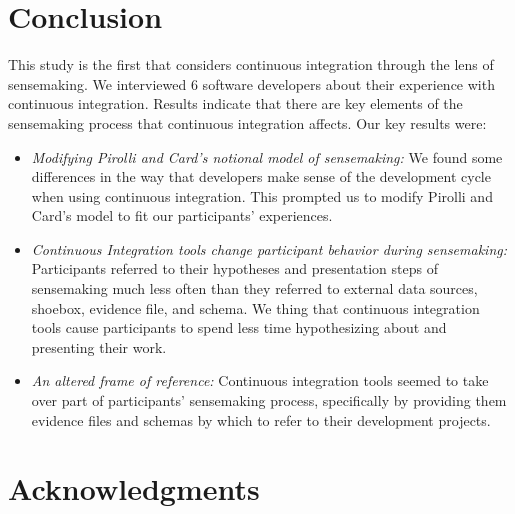 \documentclass{sig-alternate}
\begin{document}
\section{Conclusion}
This study is the first that considers continuous integration through the lens of sensemaking. We interviewed 6 software developers about their experience with continuous integration. Results indicate that there are key elements of the sensemaking process that continuous integration affects. Our key results were:
\begin{itemize}  
	\item \textit{Modifying Pirolli and Card's notional model of sensemaking:} We found some differences in the way that developers make sense of the development cycle when using continuous integration. This prompted us to modify Pirolli and Card's model to fit our participants' experiences.
	\item \textit{Continuous Integration tools change participant behavior during sensemaking:} Participants referred to their hypotheses and presentation steps of sensemaking much less often than they referred to external data sources, shoebox, evidence file, and schema. We thing that continuous integration tools cause participants to spend less time hypothesizing about and presenting their work. 
	\item \textit{An altered frame of reference:} Continuous integration tools seemed to take over part of participants' sensemaking process, specifically by providing them evidence files and schemas by which to refer to their development projects.
\end{itemize}

\section{Acknowledgments}

%

%
%
\end{document}
